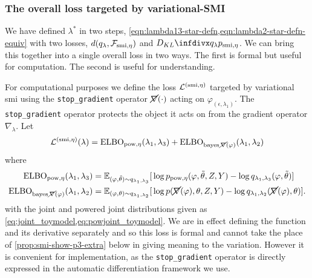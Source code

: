 \subsubsection{The overall loss targeted by variational-SMI}


We have defined $\lambda^*$ in two steps, \cref{eqn:lambda13-star-defn,eqn:lambda2-star-defn-equiv} with two losses, $d(q_\lambda,\mathcal{F}_{\operatorname{\text{smi}},\eta})$ and $\kl{q_{\lambda}}{p_{ \smi, \eta}}$.
We can bring this together into a single overall loss in two ways. The first is formal but useful for computation. The second is useful for understanding.

For computational purposes we define the loss $\mathcal{L}^{( \operatorname{\text{smi}}, \eta)}$ targeted by variational \acrshort*{smi} using the \texttt{stop\_gradient} operator $\cancel{\nabla}(\cdot)$ acting on $\varphi_{(\epsilon,\lambda_1)}$. 
The \texttt{stop\_gradient} operator protects the object it acts on from the gradient operator $\nabla_{\lambda}$.
Let
\begin{align} \label{eq:vsmi_loss}
  \mathcal{L}^{( \operatorname{\text{smi}}, \eta)}(\lambda) = \operatorname{\text{ELBO}}_{\operatorname{\text{pow}}, \eta}(\lambda_1,\lambda_3) + \operatorname{\text{ELBO}}_{\operatorname{\text{bayes}} \cancel{\nabla}(\varphi)}(\lambda_1,\lambda_2)
\end{align}
where
\begin{align}
  \operatorname{\text{ELBO}}_{\operatorname{\text{pow}}, \eta}(\lambda_1,\lambda_3) = \operatorname{\mathbb{E}}_{(\varphi,\tilde\theta)\sim q_{\lambda_1,\lambda_3}}[                & \log p_{\operatorname{\text{pow}}, \eta}(\varphi, \tilde\theta, Z, Y) - \log q_{\lambda_1,\lambda_3}(\varphi, \tilde\theta) ] \label{eq:elbo_modular_pow}                  \\
  \operatorname{\text{ELBO}}_{\operatorname{\text{bayes}} \cancel{\nabla}(\varphi)}(\lambda_1,\lambda_2) = \operatorname{\mathbb{E}}_{(\varphi,\theta)\sim q_{\lambda_1,\lambda_2}}[ & \log p( \cancel{\nabla}(\varphi), \theta, Z, Y) - \log q_{\lambda_1,\lambda_2}(\cancel{\nabla}(\varphi), \theta) ]. \label{eq:elbo_modular_stop_grad}
\end{align}
with the joint and powered joint distributions given as \cref{eq:joint_toymodel,eq:powjoint_toymodel}.
We are in effect defining the function and its derivative separately and so this loss is formal and cannot take the place of \cref{prop:smi-show-p3-extra} below in giving meaning to the variation.
However it is convenient for implementation, as the \texttt{stop\_gradient} operator is directly expressed in the automatic differentiation framework we use.

